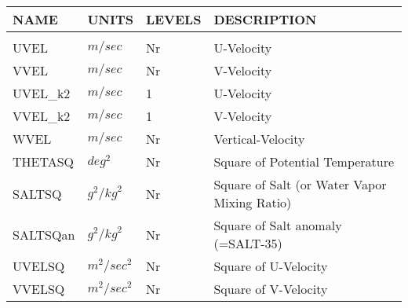 \newpage
\vspace*{\fill}
\begin{tabular}{llll}
\hline\hline
 NAME & UNITS & LEVELS & DESCRIPTION \\
\hline

&\\
 UVEL     & $m/sec$ & Nr
         &\begin{minipage}[t]{3in}
          {U-Velocity} 
         \end{minipage}\\
 VVEL     & $m/sec$ & Nr
         &\begin{minipage}[t]{3in}
          {V-Velocity} 
         \end{minipage}\\
 UVEL\_k2  & $m/sec$ & 1
         &\begin{minipage}[t]{3in}
          {U-Velocity} 
         \end{minipage}\\
 VVEL\_k2  & $m/sec$ & 1
         &\begin{minipage}[t]{3in}
          {V-Velocity} 
         \end{minipage}\\
 WVEL     & $m/sec$ & Nr
         &\begin{minipage}[t]{3in}
          {Vertical-Velocity} 
         \end{minipage}\\
 THETASQ  & $deg^2$ & Nr
         &\begin{minipage}[t]{3in}
          {Square of Potential Temperature} 
         \end{minipage}\\
 SALTSQ   & $g^2/{kg}^2$ & Nr
         &\begin{minipage}[t]{3in}
          {Square of Salt (or Water Vapor Mixing Ratio)} 
         \end{minipage}\\
 SALTSQan & $g^2/{kg}^2$ & Nr
         &\begin{minipage}[t]{3in}
          {Square of Salt anomaly (=SALT-35)} 
         \end{minipage}\\
 UVELSQ   & $m^2/sec^2$ & Nr
         &\begin{minipage}[t]{3in}
          {Square of U-Velocity} 
         \end{minipage}\\
 VVELSQ   & $m^2/sec^2$ & Nr
         &\begin{minipage}[t]{3in}
          {Square of V-Velocity} 

\end{minipage}
\end{tabular}
